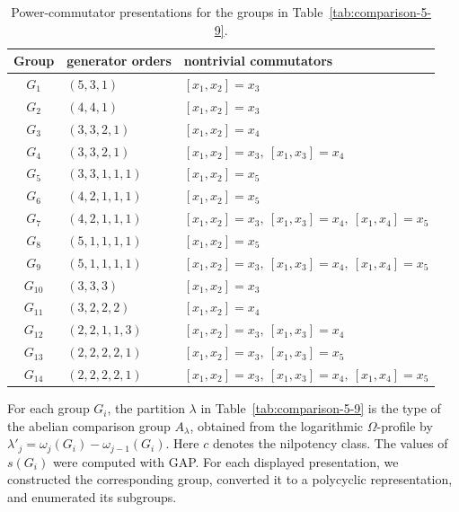 \documentclass[a4paper,11pt,reqno]{amsart}
\theoremstyle{plain}
\theoremstyle{remark}
\numberwithin{equation}{section}
\begin{document}
\begin{table}[htbp]
\centering
\setlength{\tabcolsep}{5pt}
\renewcommand{\arraystretch}{1.12}
\begin{tabular}{@{}cll@{}}
\toprule
Group & generator orders & nontrivial commutators\\
\midrule
$G_1$  & $(5,3,1)$       & $[x_1,x_2]=x_3$ \\
$G_2$  & $(4,4,1)$       & $[x_1,x_2]=x_3$ \\
$G_3$  & $(3,3,2,1)$     & $[x_1,x_2]=x_4$ \\
$G_4$  & $(3,3,2,1)$     & $[x_1,x_2]=x_3,\ [x_1,x_3]=x_4$ \\
$G_5$  & $(3,3,1,1,1)$   & $[x_1,x_2]=x_5$ \\
$G_6$  & $(4,2,1,1,1)$   & $[x_1,x_2]=x_5$ \\
$G_7$  & $(4,2,1,1,1)$   & $[x_1,x_2]=x_3,\ [x_1,x_3]=x_4,\ [x_1,x_4]=x_5$ \\
$G_8$  & $(5,1,1,1,1)$   & $[x_1,x_2]=x_5$ \\
$G_9$  & $(5,1,1,1,1)$   & $[x_1,x_2]=x_3,\ [x_1,x_3]=x_4,\ [x_1,x_4]=x_5$ \\
$G_{10}$ & $(3,3,3)$     & $[x_1,x_2]=x_3$ \\
$G_{11}$ & $(3,2,2,2)$   & $[x_1,x_2]=x_4$ \\
$G_{12}$ & $(2,2,1,1,3)$ & $[x_1,x_2]=x_3,\ [x_1,x_3]=x_4$ \\
$G_{13}$ & $(2,2,2,2,1)$ & $[x_1,x_2]=x_3,\ [x_1,x_3]=x_5$ \\
$G_{14}$ & $(2,2,2,2,1)$ & $[x_1,x_2]=x_3,\ [x_1,x_3]=x_4,\ [x_1,x_4]=x_5$ \\
\bottomrule
\end{tabular}
\vspace{0.3em}
\caption{Power-commutator presentations for the groups in
Table~\ref{tab:comparison-5-9}.}
\label{tab:comparison-5-9-presentations}
\end{table}

For each group $G_i$, the partition $\lambda$ in
Table~\ref{tab:comparison-5-9} is the type of the abelian comparison group
$A_\lambda$, obtained from the logarithmic $\Omega$-profile by
$\lambda'_j=\omega_j(G_i)-\omega_{j-1}(G_i)$. Here $c$ denotes the nilpotency
class.
The values of $s(G_i)$ were computed with GAP. 
For each displayed presentation, we constructed
the corresponding group, converted it to a polycyclic representation,
and enumerated its subgroups.
\end{document}
